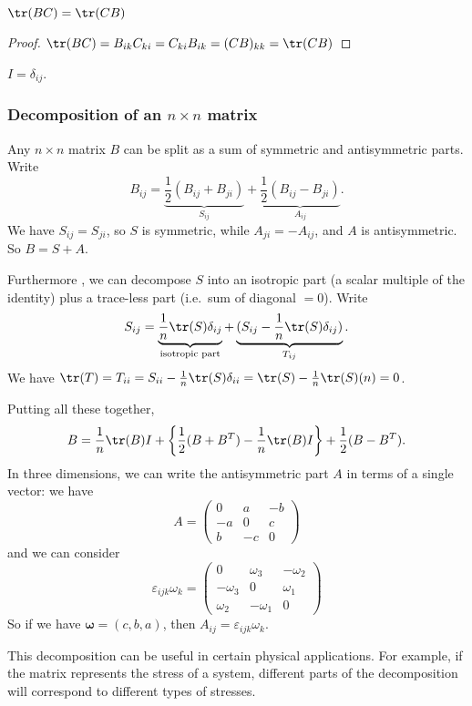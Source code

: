 \documentclass[a4paper]{article}
\begin{document}
\begin{prop}
  $\tr(BC) = \tr(CB)$
\end{prop}

\begin{proof}
  $\tr(BC) = B_{ik}C_{ki} = C_{ki}B_{ik} = (CB)_{kk} = \tr(CB)$
\end{proof}

\begin{defi}
  $I = \delta_{ij}$.
\end{defi}
\subsubsection{Decomposition of an \texorpdfstring{$n\times n$}{n x n} matrix}
Any $n\times n$ matrix $B$ can be split as a sum of symmetric and antisymmetric parts. Write
\[
  B_{ij} = \underbrace{\frac{1}{2}(B_{ij} + B_{ji})}_{S_{ij}} + \underbrace{\frac{1}{2}(B_{ij} - B_{ji})}_{A_{ij}}.
\]
We have $S_{ij} = S_{ji}$, so $S$ is symmetric, while $A_{ji} = -A_{ij}$, and $A$ is antisymmetric. So $B = S + A$.

Furthermore , we can decompose $S$ into an isotropic part (a scalar multiple of the identity) plus a trace-less part (i.e.\ sum of diagonal $= 0$). Write
\[
  S_{ij} = \underbrace{\frac{1}{n}\tr (S)\delta_{ij}}_{\text{isotropic part}} + \underbrace{(S_{ij} - \frac{1}{n}\tr(S)\delta_{ij})}_{T_{ij}}.
\]
We have $\tr(T) = T_{ii} = S_{ii} - \frac{1}{n}\tr(S)\delta_{ii} = \tr(S) - \frac{1}{n}\tr(S)(n) = 0$.

Putting all these together,
\[
  B = \frac{1}{n}\tr(B)I + \left\{\frac{1}{2}(B + B^T) - \frac{1}{n}\tr(B)I\right\} + \frac{1}{2}(B - B^T).
\]
In three dimensions, we can write the antisymmetric part $A$ in terms of a single vector: we have
\[
  A = \begin{pmatrix}
    0 & a & -b\\
    -a & 0 & c\\
    b & -c & 0
  \end{pmatrix}
\]
and we can consider
\[
  \varepsilon_{ijk}\omega_k =
  \begin{pmatrix}
    0 & \omega_3 & -\omega_2\\
    -\omega_3 & 0 & \omega_1\\
    \omega_2 & -\omega_1 & 0
  \end{pmatrix}
\]
So if we have $\mathbf{\omega} = (c, b, a)$, then $A_{ij} = \varepsilon_{ijk}\omega_k$.

This decomposition can be useful in certain physical applications. For example, if the matrix represents the stress of a system, different parts of the decomposition will correspond to different types of stresses.
\end{document}

